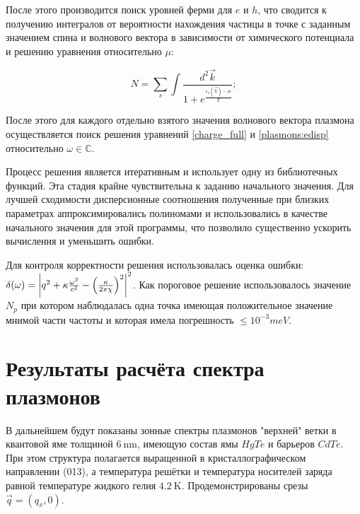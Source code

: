 \documentclass[../main.tex]{subfiles}
\begin{document}
    После этого производится поиск уровней ферми для $e$ и $h$, что сводится к получению
    интегралов от вероятности нахождения частицы в точке с заданным значением спина
    и волнового вектора в зависимости от химического потенциала и решению 
    уравнения относительно $\mu$:

    \begin{equation}
        N = \sum_s \int \frac{d^2 \vec k}{1 + e^\frac{\varepsilon_s(\vec k) - \mu}{T}};
    \end{equation}

    После этого для каждого отдельно взятого значения волнового вектора плазмона 
    осуществляется поиск решения уравнений \ref{charge_full} и \ref{plasmons:edisp}
    относительно $\omega \in \mathbb{C}$.

    Процесс решения является итеративным и использует одну из библиотечных функций.
    Эта стадия крайне чувствительна к заданию начального значения. Для лучшей 
    сходимости дисперсионные соотношения полученные при близких параметрах 
    аппроксимировались полиномами и использовались в качестве начального значения для
    этой программы, что позволило существенно ускорить вычисления и уменьшить ошибки.


    Для контроля корректности решения использовалась оценка ошибки:
    $\delta(\omega) = \abs{q^2 + \kappa \frac{\omega^2}{c^2} - 
    \left(\frac{\kappa}{2\pi \chi}\right)^2}^2$. 
    Как пороговое решение использовалось значение $N_p$ при котором наблюдалась 
    одна точка имеющая положительное значение мнимой части частоты и которая 
    имела погрешность $\leq 10^{-3} meV$.


    \section{Результаты расчёта спектра плазмонов}


    В дальнейшем будут показаны зонные спектры плазмонов "верхней" ветки в 
    квантовой яме толщиной $6~\text{nm}$, имеющую состав ямы $HgTe$ и 
    барьеров $CdTe$. При этом структура полагается выращенной в кристаллографическом
    направлении (013), а температура решётки и температура носителей заряда равной 
    температуре жидкого гелия $4.2~\text{K}$. Продемонстрированы срезы 
    $\vec q = (q_x, 0)$.
\end{document}
